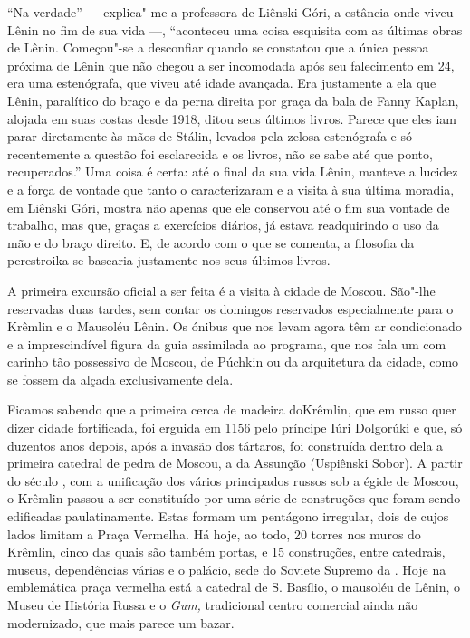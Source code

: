``Na verdade'' --- explica"-me a professora de Liênski Góri, a estância
onde viveu Lênin no fim de sua vida ---, ``aconteceu uma coisa esquisita
com as últimas obras de Lênin. Começou"-se a desconfiar quando se
constatou que a única pessoa próxima de Lênin que não chegou a ser
incomodada após seu falecimento em 24, era uma estenógrafa, que viveu
até idade avançada. Era justamente a ela que Lênin, paralítico do braço
e da perna direita por graça da bala de Fanny Kaplan, alojada em suas
costas desde 1918, ditou seus últimos livros. Parece que eles iam parar
diretamente às mãos de Stálin, levados pela zelosa estenógrafa e só
recentemente a questão foi esclarecida e os livros, não se sabe até que
ponto, recuperados.'' Uma coisa é certa: até o final da sua vida Lênin,
manteve a lucidez e a força de vontade que tanto o caracterizaram e a
visita à sua última moradia, em Liênski Góri, mostra não apenas que ele
conservou até o fim sua vontade de trabalho, mas que, graças a
exercícios diários, já estava readquirindo o uso da mão e do braço
direito. E, de acordo com o que se comenta, a filosofia da perestroika
se basearia justamente nos seus últimos livros.

A primeira excursão oficial a ser feita é a visita à cidade de Moscou.
São"-lhe reservadas duas tardes, sem contar os domingos reservados
especialmente para o Krêmlin e o Mausoléu Lênin. Os ónibus que nos levam
agora têm ar condicionado e a imprescindível figura da guia assimilada
ao programa, que nos fala um com carinho tão possessivo de Moscou, de
Púchkin ou da arquitetura da cidade, como se fossem da alçada
exclusivamente dela.

Ficamos sabendo que a primeira cerca de madeira doKrêmlin, que em russo
quer dizer cidade fortificada, foi erguida em 1156 pelo príncipe Iúri
Dolgorúki e que, só duzentos anos depois, após a invasão dos tártaros,
foi construída dentro dela a primeira catedral de pedra de Moscou, a da
Assunção (Uspiênski Sobor). A partir do século , com a unificação dos
vários principados russos sob a égide de Moscou, o Krêmlin passou a ser
constituído por uma série de construções que foram sendo edificadas
paulatinamente. Estas formam um pentágono irregular, dois de cujos lados
limitam a Praça Vermelha. Há hoje, ao todo, 20 torres nos muros do
Krêmlin, cinco das quais são também portas, e 15 construções, entre
catedrais, museus, dependências várias e o palácio, sede do Soviete
Supremo da . Hoje na emblemática praça vermelha está a catedral de
S. Basílio, o mausoléu de Lênin, o Museu de História Russa e o
\emph{Gum,} tradicional centro comercial ainda não modernizado, que mais
parece um bazar.

